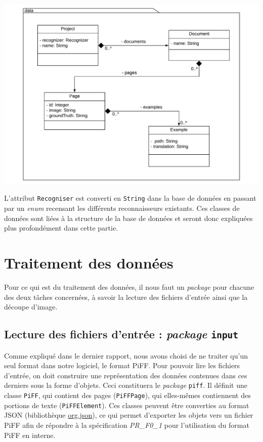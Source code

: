 \begin{mdframed}[frametitle={Figure 9 : Structure du package de données}, innerbottommargin=10]
\begin{center}
\includegraphics[scale=0.4]{assets/UML_data.pdf}
\end{center}
\end{mdframed}

L'attribut \texttt{Recogniser} est converti en \texttt{String} dans la base de données en passant par un \textit{enum} recensant les différents reconnaisseurs existants. Ces classes de données sont liées à la structure de la base de données et seront donc expliquées plus profondément dans cette partie.


\section{Traitement des données}

Pour ce qui est du traitement des données, il nous faut un \textit{package} pour chacune des deux tâches concernées, à savoir la lecture des fichiers d'entrée ainsi que la découpe d'image.

\subsection{Lecture des fichiers d'entrée : \textit{package} \texttt{input}}

Comme expliqué dans le dernier rapport, nous avons choisi de ne traiter qu'un seul format dans notre logiciel, le format PiFF. Pour pouvoir lire les fichiers d'entrée, on doit construire une représentation des données contenues dans ces derniers sous la forme d'objets. Ceci constituera le \textit{package} \texttt{piff}. Il définit une classe \texttt{PiFF}, qui contient des pages (\texttt{PiFFPage}), qui elles-mêmes contiennent des portions de texte (\texttt{PiFFElement}). Ces classes peuvent être converties au format JSON (bibliothèque \href{https://mvnrepository.com/artifact/org.json/json}{org.json}), ce qui permet d'exporter les objets vers un fichier PiFF afin de répondre à la spécification \textit{PR\_F0\_1} pour l'utilisation du format PiFF en interne.

